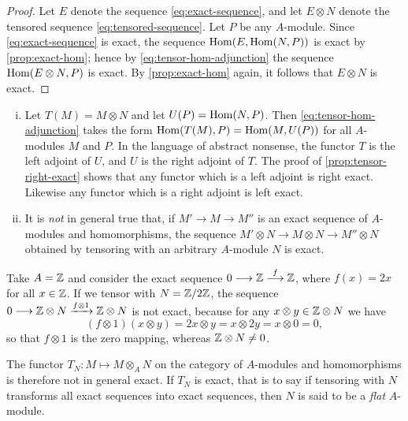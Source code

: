 \begin{proof}
Let $E$ denote the sequence \eqref{eq:exact-sequence}, and let $E \otimes N$ denote the tensored sequence \eqref{eq:tensored-sequence}. Let $P$ be any $A$-module. Since \eqref{eq:exact-sequence} is exact, the sequence $\operatorname{Hom}(E, \operatorname{Hom}(N, P))$ is exact by \eqref{prop:exact-hom}; hence by \eqref{eq:tensor-hom-adjunction} the sequence $\operatorname{Hom}(E \otimes N, P)$ is exact. By \eqref{prop:exact-hom} again, it follows that $E \otimes N$ is exact.
\end{proof}

\begin{remarks}
    \begin{enumerate}[i)]
        \item Let $T(M) = M \otimes N$ and let $U(P) = \operatorname{Hom}(N, P)$. Then \eqref{eq:tensor-hom-adjunction} takes the form $\operatorname{Hom}(T(M), P) = \operatorname{Hom}(M, U(P))$ for all $A$-modules $M$ and $P$. In the language of abstract nonsense, the functor $T$ is the left adjoint of $U$, and $U$ is the right adjoint of $T$. The proof of \eqref{prop:tensor-right-exact} shows that any functor which is a left adjoint is right exact. Likewise any functor which is a right adjoint is left exact.
        \item It is \emph{not} in general true that, if $M' \longrightarrow M \longrightarrow M''$ is an exact sequence of $A$-modules and homomorphisms, the sequence $M' \otimes N \longrightarrow M \otimes N \longrightarrow M'' \otimes N$ obtained by tensoring with an arbitrary $A$-module $N$ is exact.
    \end{enumerate}
\end{remarks}

\begin{example}
Take $A = \mathbb{Z}$ and consider the exact sequence $0 \longrightarrow \mathbb{Z} \stackrel{f}{\longrightarrow} \mathbb{Z}$, where $f(x) = 2x$ for all $x \in \mathbb{Z}$. If we tensor with $N = \mathbb{Z}/2\mathbb{Z}$, the sequence $0 \longrightarrow \mathbb{Z} \otimes N \xrightarrow{f \otimes 1} \mathbb{Z} \otimes N$ is not exact, because for any $x \otimes y \in \mathbb{Z} \otimes N$ we have
\[
    (f \otimes 1)(x \otimes y) = 2x \otimes y = x \otimes 2y = x \otimes 0 = 0,
\]
so that $f \otimes 1$ is the zero mapping, whereas $\mathbb{Z} \otimes N \neq 0$.
\end{example}

The functor $T_N \colon M \mapsto M \otimes_A N$ on the category of $A$-modules and homomorphisms is therefore not in general exact. If $T_N$ is exact, that is to say if tensoring with $N$ transforms all exact sequences into exact sequences, then $N$ is said to be a \emph{flat} $A$-module.

